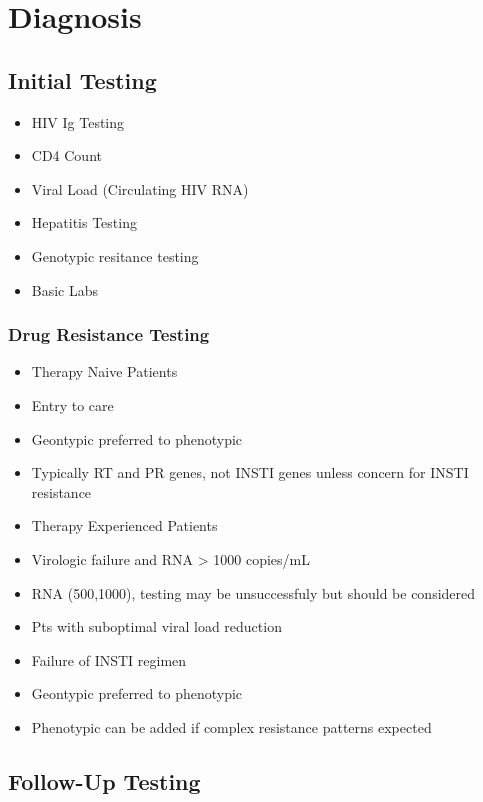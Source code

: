 \documentclass[main.tex]{subfiles}
\begin{document}
\section{Diagnosis}


\subsection{Initial Testing}

\begin{itemize}[noitemsep]
	\item HIV Ig Testing
	\item CD4 Count
	\item Viral Load (Circulating HIV RNA)
	\item Hepatitis Testing
	\item Genotypic resitance testing
	\item Basic Labs
\end{itemize}

\subsubsection{Drug Resistance Testing}
\begin{itemize}[noitemsep]
	\item Therapy Naive Patients
		\item Entry to care
		\item Geontypic preferred to phenotypic
		\item Typically RT and PR genes, not INSTI genes unless concern for INSTI resistance
	\item Therapy Experienced Patients
		\item Virologic failure and RNA > 1000 \si{copies/mL}
		\item RNA (500,1000), testing may be unsuccessfuly but should be considered
		\item Pts with suboptimal viral load reduction
		\item Failure of INSTI regimen
		\item Geontypic preferred to phenotypic
			\item Phenotypic can be added if complex resistance patterns expected
\end{itemize}



\subsection{Follow-Up Testing}
\end{document}
